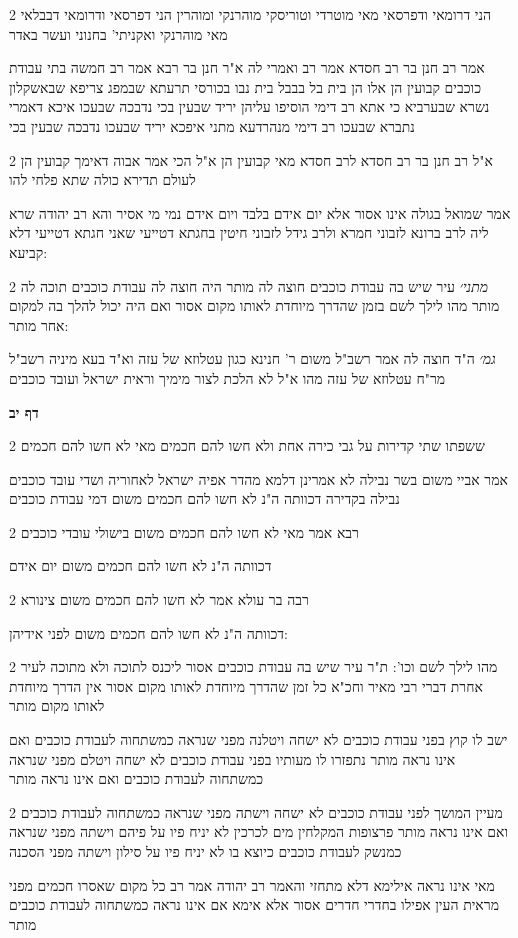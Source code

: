 \documentclass[12pt, openany]{book}
\newcommand{\sethebfont}{
\fontsize{10.5pt}{21.0pt} \selectfont
}
\newcommand{\twocol}[1]{
	{\sethebfont \begin{multicols}{2}
			#1
	\end{multicols}}	
}
\newcommand{\sectname}{}
\newcommand{\newsection}[1]{
	\addcontentsline{toc}{section}{#1}
	\renewcommand{\sectname}{#1}	
	\vspace{-\baselineskip}
	\begin{center}
		\textbf{%
\fontsize{16pt}{16pt}\selectfont
			#1}
	\end{center}
	\vspace{-\baselineskip}
	\nopagebreak
}
\begin{document}
\twocol{הני דרומאי ודפרסאי מאי מוטרדי וטוריסקי מוהרנקי ומוהרין הני דפרסאי ודרומאי דבבלאי מאי מוהרנקי ואקניתי' בחנוני ועשר באדר
\par אמר רב חנן בר רב חסדא אמר רב ואמרי לה א"ר חנן בר רבא אמר רב חמשה בתי עבודת כוכבים קבועין הן אלו הן בית בל בבבל בית נבו בכורסי תרעתא שבמפג צריפא שבאשקלון נשרא שבערביא כי אתא רב דימי הוסיפו עליהן יריד שבעין בכי נדבכה שבעכו איכא דאמרי נתברא שבעכו רב דימי מנהרדעא מתני איפכא יריד שבעכו נדבכה שבעין בכי}
\twocol{א"ל רב חנן בר רב חסדא לרב חסדא מאי קבועין הן א"ל הכי אמר אבוה דאימך קבועין הן לעולם תדירא כולה שתא פלחי להו
\par אמר שמואל בגולה אינו אסור אלא יום אידם בלבד ויום אידם נמי מי אסיר והא רב יהודה שרא ליה לרב ברונא לזבוני חמרא ולרב גידל לזבוני חיטין בחגתא דטייעי שאני חגתא דטייעי דלא קביעא:}
\twocol{{\large\emph{מתני׳}} עיר שיש בה עבודת כוכבים חוצה לה מותר היה חוצה לה עבודת כוכבים תוכה לה מותר מהו לילך לשם בזמן שהדרך מיוחדת לאותו מקום אסור ואם היה יכול להלך בה למקום אחר מותר:
\par {\large\emph{גמ׳}} ה"ד חוצה לה אמר רשב"ל משום ר' חנינא כגון עטלוזא של עזה וא"ד בעא מיניה רשב"ל מר"ח עטלוזא של עזה מהו א"ל לא הלכת לצור מימיך וראית ישראל ועובד כוכבים}
\newsection{דף יב}
\twocol{ששפתו שתי קדירות על גבי כירה אחת ולא חשו להם חכמים מאי לא חשו להם חכמים
\par אמר אביי משום בשר נבילה לא אמרינן דלמא מהדר אפיה ישראל לאחוריה ושדי עובד כוכבים נבילה בקדירה דכוותה ה"נ לא חשו להם חכמים משום דמי עבודת כוכבים}
\twocol{רבא אמר מאי לא חשו להם חכמים משום בישולי עובדי כוכבים
\par דכוותה ה"נ לא חשו להם חכמים משום יום אידם}
\twocol{רבה בר עולא אמר לא חשו להם חכמים משום צינורא
\par דכוותה ה"נ לא חשו להם חכמים משום לפני אידיהן:}
\twocol{מהו לילך לשם וכו': ת"ר עיר שיש בה עבודת כוכבים אסור ליכנס לתוכה ולא מתוכה לעיר אחרת דברי רבי מאיר וחכ"א כל זמן שהדרך מיוחדת לאותו מקום אסור אין הדרך מיוחדת לאותו מקום מותר
\par ישב לו קוץ בפני עבודת כוכבים לא ישחה ויטלנה מפני שנראה כמשתחוה לעבודת כוכבים ואם אינו נראה מותר נתפזרו לו מעותיו בפני עבודת כוכבים לא ישחה ויטלם מפני שנראה כמשתחוה לעבודת כוכבים ואם אינו נראה מותר}
\twocol{מעיין המושך לפני עבודת כוכבים לא ישחה וישתה מפני שנראה כמשתחוה לעבודת כוכבים ואם אינו נראה מותר פרצופות המקלחין מים לכרכין לא יניח פיו על פיהם וישתה מפני שנראה כמנשק לעבודת כוכבים כיוצא בו לא יניח פיו על סילון וישתה מפני הסכנה
\par מאי אינו נראה אילימא דלא מתחזי והאמר רב יהודה אמר רב כל מקום שאסרו חכמים מפני מראית העין אפילו בחדרי חדרים אסור אלא אימא אם אינו נראה כמשתחוה לעבודת כוכבים מותר}
\end{document}
